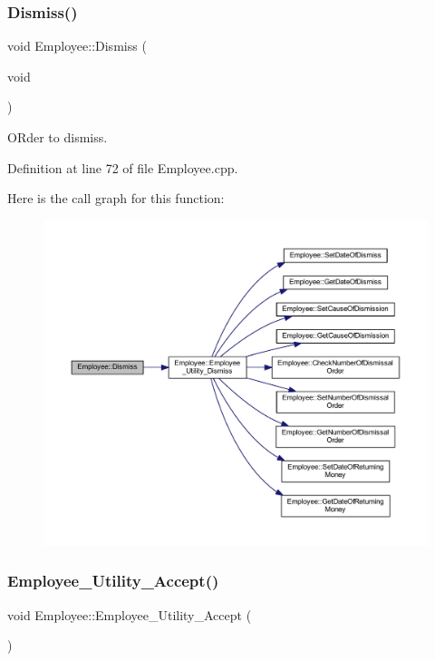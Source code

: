 \subsubsection{\texorpdfstring{Dismiss()}{Dismiss()}}
{\footnotesize\ttfamily void Employee\+::\+Dismiss (\begin{DoxyParamCaption}\item[{void}]{ }\end{DoxyParamCaption})}



O\+Rder to dismiss. 



Definition at line 72 of file Employee.\+cpp.

Here is the call graph for this function\+:
\nopagebreak
\begin{figure}[H]
\begin{center}
\leavevmode
\includegraphics[width=350pt]{class_employee_a0bec05aa09e9a7a12e3c3de49c43c158_cgraph}
\end{center}
\end{figure}
\mbox{\label{class_employee_a534f83eb6f2f106f72d802fcae00eb14}} 
\subsubsection{\texorpdfstring{Employee\+\_\+\+Utility\+\_\+\+Accept()}{Employee\_Utility\_Accept()}}
{\footnotesize\ttfamily void Employee\+::\+Employee\+\_\+\+Utility\+\_\+\+Accept (\begin{DoxyParamCaption}{ }\end{DoxyParamCaption})\hspace{0.3cm}{\ttfamily [private]}}



